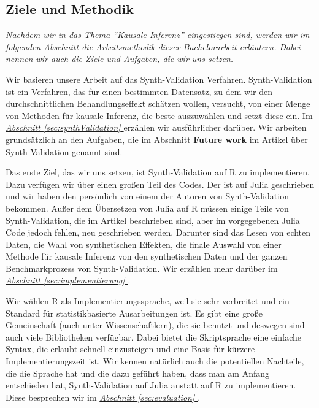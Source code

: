 \documentclass[12pt,a4paper,twoside]{scrartcl}
\numberwithin{equation}{section}
\newcommand{\refsec}[1]{\emph{\hyperref[#1]{Abschnitt \ref*{#1} }}}
\begin{document}
\subsection{Ziele und Methodik}\label{subsec:zieleUndMethodik}

\noindent
\textit{Nachdem wir in das Thema \enquote{Kausale Inferenz} eingestiegen sind, werden wir im folgenden Abschnitt die Arbeitsmethodik dieser Bachelorarbeit erläutern. Dabei nennen wir auch die Ziele und Aufgaben, die wir uns setzen.}\par

Wir basieren unsere Arbeit auf das Synth-Validation Verfahren\cite{schuler2017synth}.  Synth-Validation ist ein Verfahren, das für einen bestimmten Datensatz, zu dem wir den durchschnittlichen Behandlungseffekt schätzen wollen, versucht, von einer Menge von Methoden für kausale Inferenz, die beste auszuwählen und setzt diese ein. Im \refsec{sec:synthValidation} erzählen wir ausführlicher darüber. Wir arbeiten grundsätzlich an den Aufgaben, die im Abschnitt \textbf{Future work} im Artikel über Synth-Validation\cite{schuler2017synth} genannt sind.\par

\noindent
Das erste Ziel, das wir uns setzen, ist Synth-Validation auf R zu implementieren. Dazu verfügen wir über einen großen Teil des Codes. Der ist auf Julia geschrieben und wir haben den persönlich von einem der Autoren von Synth-Validation bekommen. Außer dem Übersetzen von Julia auf R müssen einige Teile von Synth-Validation, die im Artikel beschrieben sind, aber im vorgegebenen Julia Code jedoch fehlen, neu geschrieben werden. Darunter sind das Lesen von echten Daten, die Wahl von synthetischen Effekten, die finale Auswahl von einer Methode für kausale Inferenz von den synthetischen Daten und der ganzen Benchmarkprozess von Synth-Validation. Wir erzählen mehr darüber im \refsec{sec:implementierung}.\par

\noindent
Wir wählen R als Implementierungssprache, weil sie sehr verbreitet und ein Standard für statistikbasierte Ausarbeitungen ist. Es gibt eine große Gemeinschaft (auch unter Wissenschaftlern), die sie benutzt und deswegen sind auch viele Bibliotheken verfügbar. Dabei bietet die Skriptsprache eine einfache Syntax, die erlaubt schnell einzusteigen und eine Basis für kürzere Implementierungszeit ist. Wir kennen natürlich auch die potentiellen Nachteile, die die Sprache hat und die dazu geführt haben, dass man am Anfang entschieden hat, Synth-Validation auf Julia anstatt auf R zu implementieren. Diese besprechen wir im \refsec{sec:evaluation}.\par
   
\end{document}
